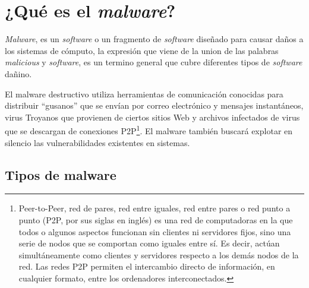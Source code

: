 \section{¿Qué es el  \emph{malware}?}

\emph{Malware}, es un \emph{software} o un fragmento de \emph{software}
diseñado para causar daños a los sistemas de cómputo, la expresión que viene de
la union de las palabras \emph{malicious} y \emph{software}, es un termino
general que cubre diferentes tipos de \emph{software} dañino\cite{avoine}.

El malware destructivo utiliza herramientas de comunicación conocidas para 
distribuir ``gusanos'' que se envían por correo electrónico y mensajes 
instantáneos, virus Troyanos que provienen de ciertos sitios Web y archivos 
infectados de virus que se descargan de conexiones P2P\footnote{Peer-to-Peer, 
red de pares, red entre iguales, red entre pares o red punto a punto (P2P, por 
sus siglas en inglés) es una red de computadoras en la que todos o algunos 
aspectos funcionan sin clientes ni servidores fijos, sino una serie de nodos que 
se comportan como iguales entre sí. Es decir, actúan simultáneamente como 
clientes y servidores respecto a los demás nodos de la red. Las redes P2P 
permiten el intercambio directo de información, en cualquier formato, entre los 
ordenadores interconectados.}. El malware también buscará explotar en silencio 
las vulnerabilidades existentes en sistemas.


\subsection{Tipos de malware}

